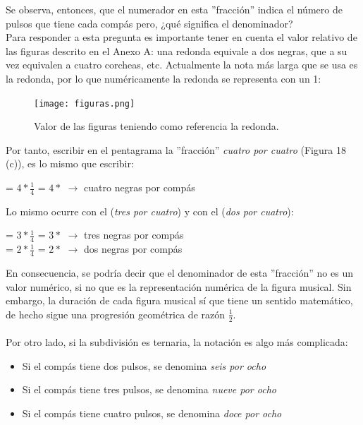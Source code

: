 \documentclass[a4paper, openright, 11pt, titlepage]{report}
\theoremstyle{definition}\newtheorem{defin}[propo]{Definition}
\theoremstyle{definition}\newtheorem{obser}[propo]{Remark}
\theoremstyle{definition}\newtheorem{ejem}[propo]{Ejemplo}
\theoremstyle{definition}\newtheorem{algoritmo}[propo]{Algoritmo}
\begin{document}
Se observa, entonces, que el numerador en esta ''fracción'' indica el número de pulsos que tiene cada compás pero, ¿qué significa el denominador?\\ 
Para responder a esta pregunta es importante tener en cuenta el valor relativo de las figuras descrito en el Anexo A: una redonda equivale a dos negras, que a su vez equivalen a cuatro corcheas, etc. Actualmente la nota más larga que se usa es la redonda, por lo que numéricamente la redonda se representa con un 1:
\begin{figure}[H]
    \centering
    \texttt{[image: figuras.png]}
    \caption{Valor de las figuras teniendo como referencia la redonda.}
    \label{redonda}
\end{figure}
Por tanto, escribir en el pentagrama la ''fracción'' \textit{cuatro por cuatro} (Figura 18 (c)), es lo mismo que escribir:
\begin{center}
     = $4 * \frac{1}{4}$ = $4 * $\musQuarter \hspace{0.3cm} $\longrightarrow$ \hspace{0.3cm} cuatro negras por compás
\end{center}
Lo mismo ocurre con el  (\textit{tres por cuatro}) y con el  (\textit{dos por cuatro}):
\begin{center}
     = $3 * \frac{1}{4}$ = $3 * $\musQuarter \hspace{0.3cm} $\longrightarrow$ \hspace{0.3cm} tres negras por compás\\
     = $2 * \frac{1}{4}$ = $2 * $\musQuarter \hspace{0.3cm} $\longrightarrow$ \hspace{0.3cm} dos negras por compás
\end{center}
En consecuencia, se podría decir que el denominador de esta ''fracción'' no es un valor numérico, si no que es la representación numérica de la figura musical. Sin embargo, la duración de cada figura musical sí que tiene un sentido matemático, de hecho sigue una progresión geométrica de razón $\frac{1}{2}$.\\\\
Por otro lado, si la subdivisión es ternaria, la notación es algo más complicada: 
\begin{itemize}
    \item Si el compás tiene dos pulsos, se denomina \textit{seis por ocho}
    \item Si el compás tiene tres pulsos, se denomina \textit{nueve por ocho}
    \item Si el compás tiene cuatro pulsos, se denomina \textit{doce por ocho}
\end{itemize}
\end{document}
